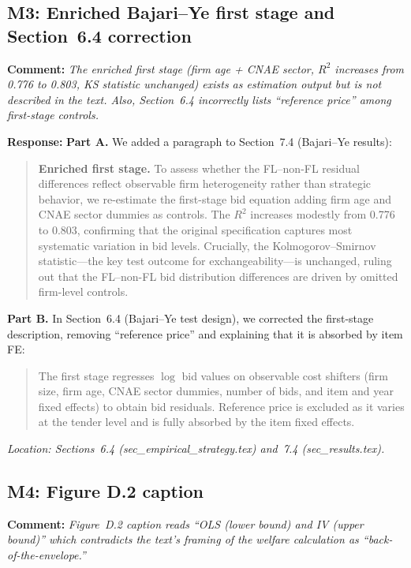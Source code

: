 \documentclass[12pt]{article}
\newcommand{\referee}[1]{\medskip\noindent\textbf{Comment:} \textit{#1}\medskip}
\newcommand{\response}[1]{\noindent\textbf{Response:} #1}
\begin{document}
\subsection*{M3: Enriched Bajari--Ye first stage and Section~6.4 correction}

\referee{The enriched first stage (firm age + CNAE sector, $R^2$ increases
from 0.776 to 0.803, KS statistic unchanged) exists as estimation output
but is not described in the text. Also, Section~6.4 incorrectly lists
``reference price'' among first-stage controls.}

\response{\textbf{Part A.} We added a paragraph to Section~7.4
(Bajari--Ye results):}

\begin{quote}
\textbf{Enriched first stage.} To assess whether the FL--non-FL residual
differences reflect observable firm heterogeneity rather than strategic
behavior, we re-estimate the first-stage bid equation adding firm age and
CNAE sector dummies as controls. The $R^2$ increases modestly from 0.776
to 0.803, confirming that the original specification captures most
systematic variation in bid levels. Crucially, the
Kolmogorov--Smirnov statistic---the key test outcome for
exchangeability---is unchanged, ruling out that the FL--non-FL bid
distribution differences are driven by omitted firm-level controls.
\end{quote}

\noindent\textbf{Part B.} In Section~6.4 (Bajari--Ye test design), we
corrected the first-stage description, removing ``reference price'' and
explaining that it is absorbed by item FE:

\begin{quote}
The first stage regresses $\log$ bid values on observable cost shifters
(firm size, firm age, CNAE sector dummies, number of bids, and item and
year fixed effects) to obtain bid residuals. Reference price is excluded
as it varies at the tender level and is fully absorbed by the item fixed
effects.
\end{quote}

\noindent\textit{Location: Sections~6.4 (sec\_empirical\_strategy.tex)
and~7.4 (sec\_results.tex).}

\subsection*{M4: Figure D.2 caption}

\referee{Figure~D.2 caption reads ``OLS (lower bound) and IV (upper
bound)'' which contradicts the text's framing of the welfare calculation
as ``back-of-the-envelope.''}
\end{document}
